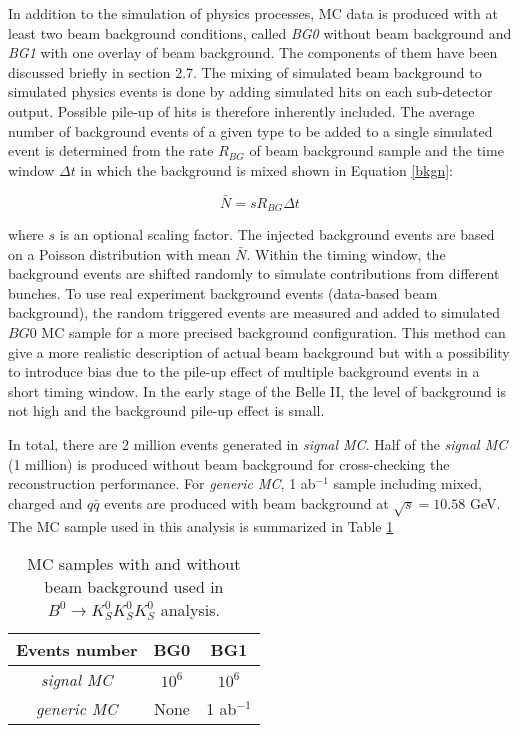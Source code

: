In addition to the simulation of physics processes,  MC data is produced with at least two beam background conditions, called \textit{BG0} without beam background and \textit{BG1} with one overlay of beam background. The components of them have been discussed briefly in section 2.7. The mixing of simulated beam background to simulated physics events is done by adding simulated hits on each sub-detector output. Possible pile-up of hits is therefore inherently included. The average number of background events of a given type to be added to a single simulated event is determined from the rate $R_{BG}$ of beam background sample and the time window $\Delta t$ in which the background is mixed shown in Equation \ref{bkgn}:

\begin{equation}\label{bkgn}
	\bar{N} = sR_{BG}\Delta t
\end{equation}

where $s$ is an optional scaling factor. The injected background events are based on a Poisson distribution with mean $\bar{N}$. Within the timing window, the background events are shifted randomly to simulate contributions from different bunches. To use real experiment background events (data-based beam background), the random triggered events are measured and added to
simulated $BG0$ MC sample for a more precised background configuration. This method can give a more realistic description of actual beam background but with a possibility to introduce bias due to the pile-up effect of multiple background events in a short timing window. In the early stage of the Belle II, the level of background is not high and the background pile-up effect is small.

In total, there are 2 million events generated in \textit{signal MC}. Half of the \textit{signal MC} (1 million) is produced without beam background for cross-checking the reconstruction performance. For \textit{generic MC}, 1 ab$^{-1}$ sample including mixed, charged and $q\bar{q}$ events are produced with beam background at  $\sqrt{s} = 10.58 $ GeV. The MC sample used in this analysis is summarized in Table \ref{tab:mc_all}

\begin{table}
	\large
	\caption{MC samples with and without beam background used in $B^0 \to K_S^0  K_S^0  K_S^0$ analysis.}
	\label{tab:mc_all}
	\centering
	\begin{tabular}{c|c|c}
		\hline 
		Events number & BG0 & BG1 \\
		\hline
		\textit{\textit{signal MC}} & $10^6$ & $10^6$ \\
		\hline
		\textit{\textit{generic MC}} & None & 1 ab$^{-1}$\\
		\hline
	\end{tabular}
\end{table}


